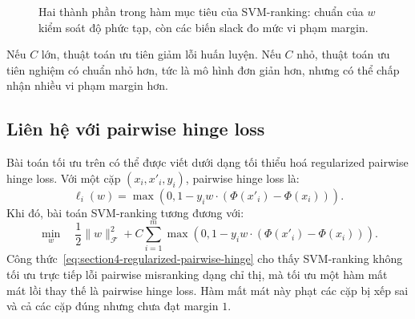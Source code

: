 \begin{figure}[H]
    \centering
    \caption{Hai thành phần trong hàm mục tiêu của SVM-ranking: chuẩn của \(w\) kiểm soát độ phức tạp, còn các biến slack đo mức vi phạm margin.}
    \label{fig:section4-primal-objective-components}
\end{figure}

Nếu \(C\) lớn, thuật toán ưu tiên giảm lỗi huấn luyện. Nếu \(C\) nhỏ, thuật toán ưu tiên nghiệm có chuẩn nhỏ hơn, tức là mô hình đơn giản hơn, nhưng có thể chấp nhận nhiều vi phạm margin hơn.

\subsection{Liên hệ với pairwise hinge loss}

Bài toán tối ưu trên có thể được viết dưới dạng tối thiểu hoá regularized pairwise hinge loss. Với một cặp \((x_i,x'_i,y_i)\), pairwise hinge loss là:
\begin{equation}
    \ell_i(w)
    =
    \max
    \left(
        0,
        1
        -
        y_i
        w\cdot
        \left(
            \Phi(x'_i)-\Phi(x_i)
        \right)
    \right).
    \label{eq:section4-pairwise-hinge-loss}
\end{equation}
Khi đó, bài toán SVM-ranking tương đương với:
\begin{equation}
    \min_w
    \quad
    \frac{1}{2}\|w\|_{\mathcal{F}}^2
    +
    C
    \sum_{i=1}^{m}
    \max
    \left(
        0,
        1
        -
        y_i
        w\cdot
        \left(
            \Phi(x'_i)-\Phi(x_i)
        \right)
    \right).
    \label{eq:section4-regularized-pairwise-hinge}
\end{equation}
Công thức~\eqref{eq:section4-regularized-pairwise-hinge} cho thấy SVM-ranking không tối ưu trực tiếp lỗi pairwise misranking dạng chỉ thị, mà tối ưu một hàm mất mát lồi thay thế là pairwise hinge loss. Hàm mất mát này phạt các cặp bị xếp sai và cả các cặp đúng nhưng chưa đạt margin \(1\).


